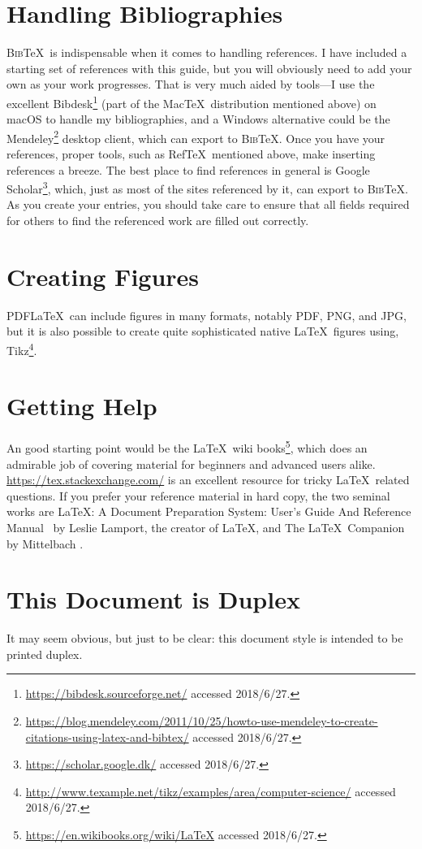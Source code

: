 \section*{Handling Bibliographies}
\label{sec:handl-bibl}

\textsc{Bib}\negthinspace\TeX\ is indispensable when it comes to
handling references. I have included a starting set of references with
this guide, but you will obviously need to add your own as your work
progresses.  That is very much aided by tools---I use the excellent
Bibdesk\footnote{\url{https://bibdesk.sourceforge.net/} accessed 2018/6/27.} (part of the
Mac\TeX\ distribution mentioned above) on macOS to handle my
bibliographies, and a Windows alternative could be the
Mendeley\footnote{\url{https://blog.mendeley.com/2011/10/25/howto-use-mendeley-to-create-citations-using-latex-and-bibtex/} accessed 2018/6/27.}
desktop client, which can export to \textsc{Bib}\negthinspace\TeX.
Once you have your references, proper tools, such as Ref\TeX\
mentioned above, make inserting references a breeze.  The best place
to find references in general is Google
Scholar\footnote{\url{https://scholar.google.dk/} accessed 2018/6/27.}, which, just as
most of the sites referenced by it, can export to
\textsc{Bib}\negthinspace\TeX. As you create your entries, you should
take care to ensure that all fields required for others to find the
referenced work are filled out correctly.

\section*{Creating Figures}
\label{sec:creating-figures}

PDF\LaTeX\ can include figures in many formats, notably \acs{PDF},
\acs{PNG}, and \acs{JPG}, but it is also possible to create quite
sophisticated native \LaTeX\ figures using, \eg
Tikz\footnote{\url{http://www.texample.net/tikz/examples/area/computer-science/} accessed 2018/6/27.}.

\section*{Getting Help}
\label{sec:getting-help}

An good starting point would be the \LaTeX\ wiki
books\footnote{\url{https://en.wikibooks.org/wiki/LaTeX} accessed 2018/6/27.}, which does
an admirable job of covering material for beginners and advanced users
alike.  \url{https://tex.stackexchange.com/} is an excellent resource
for tricky \LaTeX\ related questions. If you prefer your reference
material in hard copy, the two seminal works are \LaTeX: A Document
Preparation System: User's Guide And Reference
Manual~\cite{Lamport1994:LADPSUGARM1994} by Leslie Lamport, the creator of \LaTeX,
and The \LaTeX\ Companion~\cite{Mittelbach2004:TLC2004}
by Mittelbach \etal.

\section*{This Document is Duplex}
\label{sec:print-this-docum}

It may seem obvious, but just to be clear: this document style is intended to be printed duplex.



